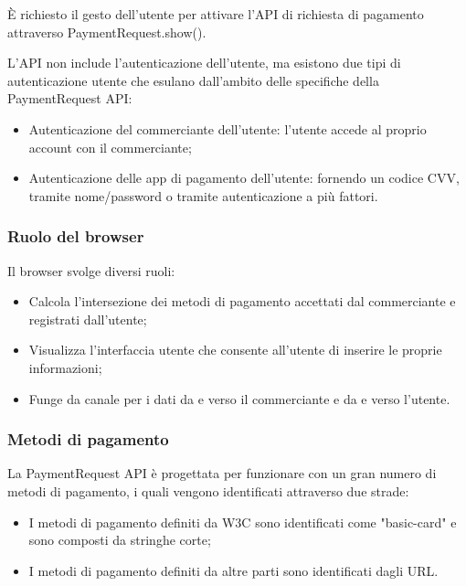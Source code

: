 \documentclass[italian]{article}
\begin{document}
	È richiesto il gesto dell'utente per attivare l'API di richiesta di pagamento attraverso PaymentRequest.show().
	
	L'API non include l'autenticazione dell'utente, ma esistono due tipi di autenticazione utente che esulano dall'ambito delle specifiche della PaymentRequest API:
	\begin{itemize}
	\item Autenticazione del commerciante dell'utente: l'utente accede al proprio account con il commerciante;
	\item Autenticazione delle app di pagamento dell'utente: fornendo un codice CVV, tramite nome/password o tramite autenticazione a più fattori.
	\end{itemize}
	
	\subsubsection{Ruolo del browser}
	Il browser svolge diversi ruoli:
	\begin{itemize}
	\item Calcola l'intersezione dei metodi di pagamento accettati dal commerciante e registrati dall'utente;
	\item Visualizza l'interfaccia utente che consente all'utente di inserire le proprie informazioni;
	\item Funge da canale per i dati da e verso il commerciante e da e verso l'utente.
	\end{itemize}
	
	\subsubsection{Metodi di pagamento}
	La PaymentRequest API è progettata per funzionare con un gran numero di metodi di pagamento, i quali vengono identificati attraverso due strade:
	\begin{itemize}
		\item I metodi di pagamento definiti da W3C sono identificati come "basic-card" e sono composti da stringhe corte;
		\item I metodi di pagamento definiti da altre parti sono identificati dagli URL.
	\end{itemize}
	
\end{document}

